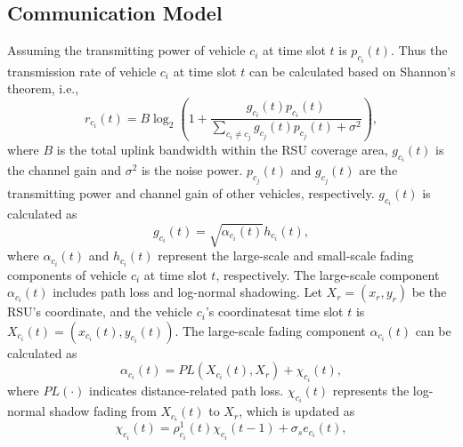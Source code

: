 \documentclass[lettersize,journal,onecolumn]{IEEEtran}
\begin{document}
\subsection{Communication Model}
Assuming the transmitting power of vehicle ${{{c}}_{i}}$ at time slot $t$ is ${{p}_{{{c}_{i}}}}(t)$. Thus the transmission rate of vehicle ${{{c}}_{i}}$ at time slot $t$ can be calculated based on Shannon's theorem, i.e.,
\begin{equation}
{{r}_{{{{c}}_{i}}}}(t)=B{{\log }_{2}}\left( 1+\frac{{{g}_{{{c}_{i}}}}\left( t \right){{p}_{{{c}_{i}}}}\left( t \right)}{\sum\nolimits_{{{c}_{i}}\ne {{c}_{j}}}{{{g}_{{{c}_{j}}}}\left( t \right){{p}_{{{c}_{j}}}}\left( t \right)+{{\sigma }^{2}}}} \right),
\label{eq1}
\end{equation}	 
where $B$ is the total uplink bandwidth within the RSU coverage area, ${{g}_{{{c}_{i}}}}(t)$ is the channel gain and ${{\sigma }^{2}}$ is the noise power. ${{p}_{{{c}_{j}}}}(t)$ and ${{g}_{{{c}_{j}}}}(t)$ are the transmitting power and channel gain of other vehicles, respectively. ${{g}_{{{c}_{i}}}}(t)$ is calculated as
\begin{equation}
{{g}_{{{c}_{i}}}}(t)=\sqrt{{{\alpha }_{{{c}_{i}}}}(t)}{{h}_{{{c}_{i}}}}(t),
\label{eq2}
\end{equation}
where ${{\alpha }_{{{c}_{i}}}}(t)$ and ${{h}_{{{c}_{i}}}}(t)$ represent the large-scale and small-scale fading components of vehicle ${{{c}}_{i}}$ at time slot $t$, respectively. The large-scale component ${{\alpha }_{{{c}_{i}}}}(t)$ includes path loss and log-normal shadowing. Let ${{X}_{r}}=({{x}_{r}},{{y}_{r}})$ be the RSU's coordinate, and the vehicle ${{{c}}_{i}}$'s coordinatesat time slot $t$ is ${{X}_{{{c}_{i}}}}(t)=({{x}_{{{c}_{i}}}}(t),{{y}_{{{c}_{i}}}}(t))$. The large-scale fading component ${{\alpha }_{{{c}_{i}}}}(t)$ can be calculated as
\begin{equation}
{{\alpha }_{{{c}_{i}}}}(t)={PL}({{X}_{{{c}_{i}}}}(t),{{X}_{r}})+{{\chi }_{{{c}_{i}}}}(t),
\label{eq3}
\end{equation}
where ${PL}\left( \cdot  \right)$ indicates distance-related path loss. ${{\chi }_{{{c}_{i}}}}(t)$ represents the log-normal shadow fading from ${{X}_{{{c}_{i}}}}(t)$ to ${{X}_{r}}$, which is updated as
\begin{equation}
{{\chi }_{{{c}_{i}}}}(t)=\rho _{{{c}_{i}}}^{1}(t){{\chi }_{{{c}_{i}}}}(t-1)+{{\sigma }_{s}}{{e}_{{{c}_{i}}}}(t),
\label{eq4}
\end{equation}
\end{document}
